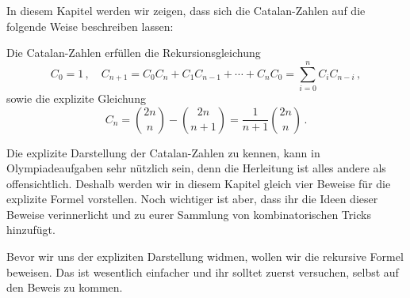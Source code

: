 In diesem Kapitel werden wir zeigen, dass sich die Catalan-Zahlen auf die folgende Weise beschreiben lassen:
\begin{satzmitnamen}[Satz]
	Die Catalan-Zahlen erfüllen die Rekursionsgleichung
	\begin{equation*}
		C_0=1\,,\quad C_{n+1}=C_0C_n+C_1C_{n-1}+\dotsb+C_nC_0=\sum_{i=0}^nC_iC_{n-i}\,,
	\end{equation*}
	sowie die explizite Gleichung
	\begin{equation*}
		C_n=\binom{2n}{n}-\binom{2n}{n+1}=\frac{1}{n+1}\binom{2n}{n}\,.
	\end{equation*}
\end{satzmitnamen}
Die explizite Darstellung der Catalan-Zahlen zu kennen, kann in Olympiadeaufgaben sehr nützlich sein, denn die Herleitung ist alles andere als offensichtlich. Deshalb werden wir in diesem Kapitel gleich vier Beweise für die explizite Formel vorstellen. Noch wichtiger ist aber, dass ihr die Ideen dieser Beweise verinnerlicht und zu eurer Sammlung von kombinatorischen Tricks hinzufügt.

Bevor wir uns der expliziten Darstellung widmen, wollen wir die rekursive Formel beweisen. Das ist wesentlich einfacher und ihr solltet zuerst versuchen, selbst auf den Beweis zu kommen.

